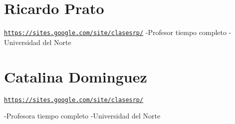\hypertarget{developers_rapt}{}\section{Ricardo Prato}\label{developers_rapt}
\href{https://sites.google.com/site/clasesrp/}{\tt https\-://sites.\-google.\-com/site/clasesrp/} -\/\-Profesor tiempo completo -\/\-Universidad del Norte\hypertarget{developers_cdg}{}\section{Catalina Dominguez}\label{developers_cdg}
\href{https://sites.google.com/site/clasesrp/}{\tt https\-://sites.\-google.\-com/site/clasesrp/}

-\/\-Profesora tiempo completo -\/\-Universidad del Norte 